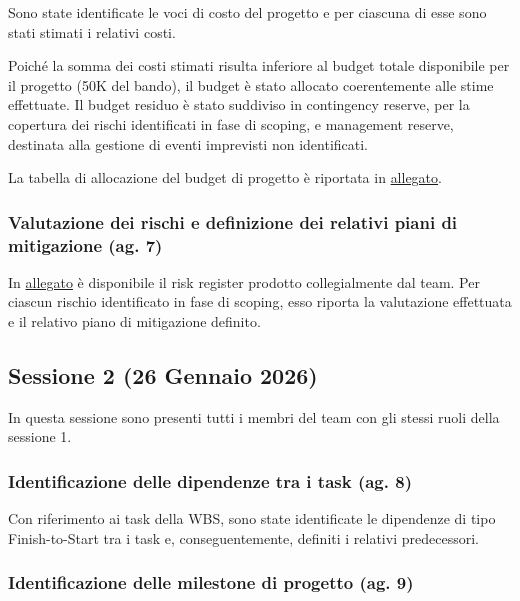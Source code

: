 \documentclass[11pt,a4paper]{article}
\begin{document}
{Sono state identificate le voci di costo del progetto e per ciascuna di esse sono stati stimati i relativi costi.}

{Poiché la somma dei costi stimati risulta inferiore al budget totale disponibile per il progetto (50K del bando), il budget è stato allocato coerentemente alle stime effettuate. Il budget residuo è stato suddiviso in contingency reserve, per la copertura dei rischi identificati in fase di scoping, e management reserve, destinata alla gestione di eventi imprevisti non identificati.}

{La tabella di allocazione del budget di progetto è riportata in \hyperref[sec:budget]{allegato}.}

\subsubsection{\texorpdfstring{{Valutazione dei rischi e definizione dei relativi piani di mitigazione (ag. 7)}}{Valutazione dei rischi e definizione dei relativi piani di mitigazione (ag. 7)}}\label{h.m0dt63pfa45s}

{In \hyperref[sec:risk]{allegato} è disponibile il risk register prodotto collegialmente dal team. Per ciascun rischio identificato in fase di scoping, esso riporta la valutazione effettuata e il relativo piano di mitigazione definito.}

\subsection{\texorpdfstring{{Sessione 2 (26 Gennaio 2026)}}{Sessione 2 (26 Gennaio 2026)}}\label{h.pjo9aljnwtqk}

{In questa sessione sono presenti tutti i membri del team con gli stessi ruoli della sessione 1.}

\subsubsection{\texorpdfstring{{Identificazione delle dipendenze tra i task (ag. 8)}}{Identificazione delle dipendenze tra i task (ag. 8)}}\label{h.11ufs4hmubt1}

{Con riferimento ai task della WBS, sono state identificate le dipendenze di tipo Finish-to-Start tra i task e, conseguentemente, definiti i relativi predecessori.}

\subsubsection{\texorpdfstring{{Identificazione delle milestone di progetto (ag. 9)}}{Identificazione delle milestone di progetto (ag. 9)}}\label{h.m11igq520jw0}
\end{document}
